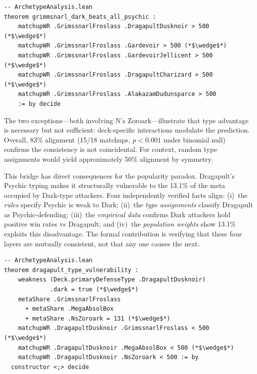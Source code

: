 \documentclass[journal]{IEEEtran}
\begin{document}
\begin{lstlisting}[caption={Dark attackers beat Psychic defenders: bridge alignment.},label={lst:grimm}]
-- ArchetypeAnalysis.lean
theorem grimmsnarl_dark_beats_all_psychic :
    matchupWR .GrimssnarlFroslass .DragapultDusknoir > 500 (*$\wedge$*)
    matchupWR .GrimssnarlFroslass .Gardevoir > 500 (*$\wedge$*)
    matchupWR .GrimssnarlFroslass .GardevoirJellicent > 500 (*$\wedge$*)
    matchupWR .GrimssnarlFroslass .DragapultCharizard > 500 (*$\wedge$*)
    matchupWR .GrimssnarlFroslass .AlakazamDudunsparce > 500
    := by decide
\end{lstlisting}

The two exceptions---both involving N's Zoroark---illustrate that type advantage is necessary but not sufficient: deck-specific interactions modulate the prediction.
Overall, 83\% alignment (15/18 matchups, $p < 0.001$ under binomial null) confirms the consistency is not coincidental.
For context, random type assignments would yield approximately 50\% alignment by symmetry.

This bridge has direct consequences for the popularity paradox.
Dragapult's Psychic typing makes it structurally vulnerable to the 13.1\% of the meta occupied by Dark-type attackers.
Four independently verified facts align: (i)~the \emph{rules} specify Psychic is weak to Dark; (ii)~the \emph{type assignments} classify Dragapult as Psychic-defending; (iii)~the \emph{empirical data} confirms Dark attackers hold positive win rates vs Dragapult; and (iv)~the \emph{population weights} show 13.1\% exploits this disadvantage.
The formal contribution is verifying that these four layers are mutually consistent, not that any one causes the next.

\begin{lstlisting}[caption={Dragapult's Psychic typing is exploited by 13.1\% of the field.},label={lst:dragvuln}]
-- ArchetypeAnalysis.lean
theorem dragapult_type_vulnerability :
    weakness (Deck.primaryDefenseType .DragapultDusknoir)
             .dark = true (*$\wedge$*)
    metaShare .GrimssnarlFroslass
      + metaShare .MegaAbsolBox
      + metaShare .NsZoroark = 131 (*$\wedge$*)
    matchupWR .DragapultDusknoir .GrimssnarlFroslass < 500 (*$\wedge$*)
    matchupWR .DragapultDusknoir .MegaAbsolBox < 500 (*$\wedge$*)
    matchupWR .DragapultDusknoir .NsZoroark < 500 := by
  constructor <;> decide
\end{lstlisting}
\end{document}

